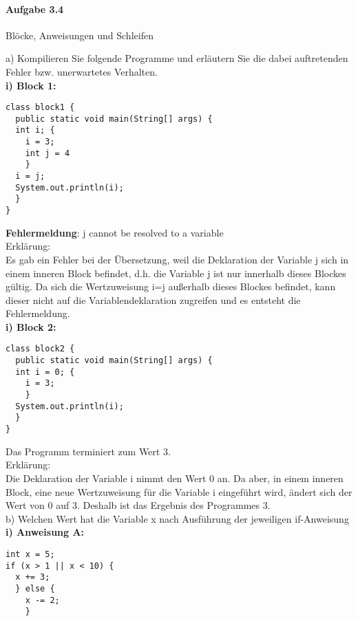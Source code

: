 \documentclass[paper=a4, fontsize=11pt]{scrartcl}
\numberwithin{equation}{section}
\numberwithin{figure}{section}
\numberwithin{table}{section}
\begin{document}

\paragraph{Aufgabe 3.4} Blöcke, Anweisungen und Schleifen 

a) Kompilieren Sie folgende Programme und erläutern Sie die dabei auftretenden Fehler bzw. unerwartetes Verhalten. \\

\textbf{i) Block 1:} \\

\begin{lstlisting}
class block1 {
  public static void main(String[] args) {
  int i; {
    i = 3;
    int j = 4
    }
  i = j;
  System.out.println(i);
  }
}  
\end{lstlisting}

\textbf{Fehlermeldung}: j cannot be resolved to a variable\\
Erklärung:\\
Es gab ein Fehler bei der Übersetzung, weil die Deklaration der Variable j sich in einem inneren Block befindet, d.h. die Variable j ist nur innerhalb dieses Blockes gültig. Da sich die Wertzuweisung i=j außerhalb dieses Blockes befindet, kann dieser nicht auf die Variablendeklaration zugreifen und es entsteht die Fehlermeldung. \\

\textbf{i) Block 2:} \\
\begin{lstlisting}
class block2 {
  public static void main(String[] args) {
  int i = 0; {
    i = 3;
    }
  System.out.println(i);
  }
}  
\end{lstlisting}

Das Programm terminiert zum Wert 3.\\
Erklärung:\\
Die Deklaration der Variable i nimmt den Wert 0 an. Da aber, in einem inneren Block, eine neue Wertzuweisung für die Variable i eingeführt wird, ändert sich der  Wert von 0 auf 3. Deshalb ist das Ergebnis des Programmes 3. \\

b) Welchen Wert hat die Variable x nach Ausführung der jeweiligen if-Anweisung \\

\textbf{i) Anweisung A:} \\
\begin{lstlisting}
int x = 5;
if (x > 1 || x < 10) {
  x += 3;
  } else {
    x -= 2;
    }
\end{lstlisting}
\end{document}
